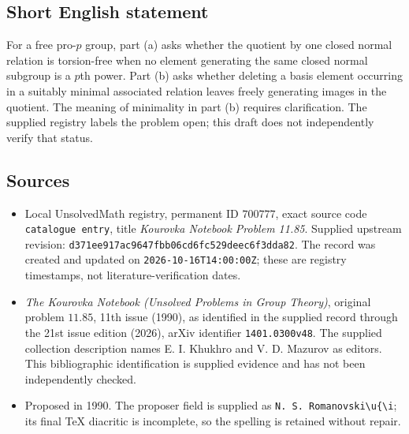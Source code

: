 \documentclass[11pt]{article}
\begin{document}
\subsection{Short English statement}
For a free pro-\(p\) group, part (a) asks whether the quotient by one closed normal relation is torsion-free when no element generating the same closed normal subgroup is a \(p\)th power. Part (b) asks whether deleting a basis element occurring in a suitably minimal associated relation leaves freely generating images in the quotient. The meaning of minimality in part (b) requires clarification. The supplied registry labels the problem open; this draft does not independently verify that status.
\subsection{Sources}
\begin{itemize}
\item Local UnsolvedMath registry, permanent ID \(700777\), exact source code \texttt{catalogue entry}, title \emph{Kourovka Notebook Problem 11.85}. Supplied upstream revision: \texttt{d371ee917ac9647fbb06cd6fc529deec6f3dda82}. The record was created and updated on \texttt{2026-10-16T14:00:00Z}; these are registry timestamps, not literature-verification dates.
\item \emph{The Kourovka Notebook (Unsolved Problems in Group Theory)}, original problem \(11.85\), 11th issue (1990), as identified in the supplied record through the 21st issue edition (2026), arXiv identifier \texttt{1401.0300v48}. The supplied collection description names E. I. Khukhro and V. D. Mazurov as editors. This bibliographic identification is supplied evidence and has not been independently checked.
\item Proposed in 1990. The proposer field is supplied as \texttt{N. S. Romanovski\textbackslash{}u\{\textbackslash{}i}; its final TeX diacritic is incomplete, so the spelling is retained without repair.
\end{itemize}
\end{document}
